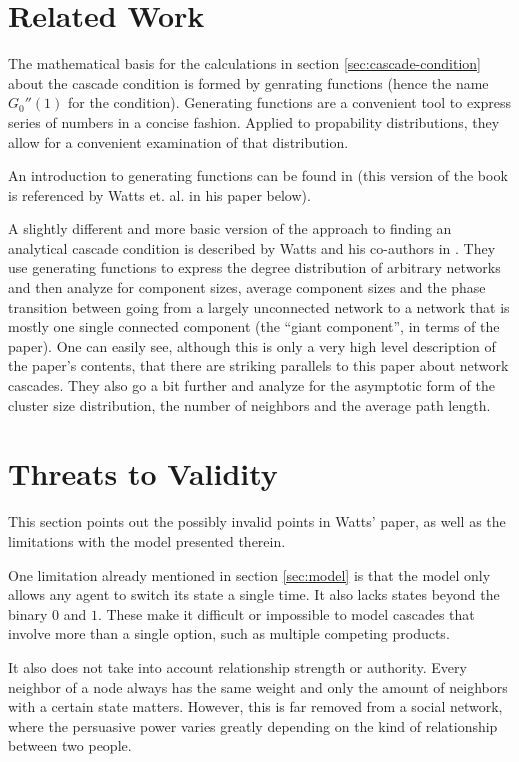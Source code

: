 \documentclass{sig-alternate-05-2015}
\begin{document}
\section{Related Work}

The mathematical basis for the calculations in section \ref{sec:cascade-condition} about the cascade condition is formed by genrating functions (hence the name $G_0''(1)$ for the condition). Generating functions are a convenient tool to express series of numbers in a concise fashion. Applied to propability distributions, they allow for a convenient examination of that distribution.

An introduction to generating functions can be found in \cite{wilf1994generatingfunctionology} (this version of the book is referenced by Watts et. al. in his paper below).

A slightly different and more basic version of the approach to finding an analytical cascade condition is described by Watts and his co-authors in \cite{newman2001random}. They use generating functions to express the degree distribution of arbitrary networks and then analyze for component sizes, average component sizes and the phase transition between going from a largely unconnected network to a network that is mostly one single connected component (the ``giant component'', in terms of the paper). One can easily see, although this is only a very high level description of the paper's contents, that there are striking parallels to this paper about network cascades. They also go a bit further and analyze for the asymptotic form of the cluster size distribution, the number of neighbors and the average path length.


\section{Threats to Validity}\label{sec:threats}

This section points out the possibly invalid points in Watts' paper\cite{simplemodel}, as well as the limitations with the model presented therein.

One limitation already mentioned in section \ref{sec:model} is that the model only allows any agent to switch its state a single time. It also lacks states beyond the binary $0$ and $1$. These make it difficult or impossible to model cascades that involve more than a single option, such as multiple competing products.

It also does not take into account relationship strength or authority. Every neighbor of a node always has the same weight and only the amount of neighbors with a certain state matters. However, this is far removed from a social network, where the persuasive power varies greatly depending on the kind of relationship between two people.
\end{document}
